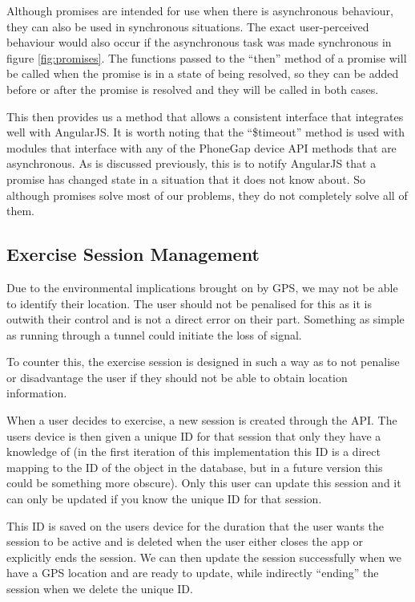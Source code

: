 Although promises are intended for use when there is asynchronous
behaviour, they can also be used in synchronous situations. The exact
user-perceived behaviour would also occur if the asynchronous task was
made synchronous in figure \ref{fig:promises}. The functions passed to
the ``then'' method of a promise will be called when the promise is in
a state of being resolved, so they can be added before or after the
promise is resolved and they will be called in both cases.

This then provides us a method that allows a consistent interface that
integrates well with AngularJS. It is worth noting that the
``\$timeout'' method is used with modules that interface with any of
the PhoneGap device API methods that are asynchronous. As is discussed
previously, this is to notify AngularJS that a promise has changed
state in a situation that it does not know about. So although promises
solve most of our problems, they do not completely solve all of them.

\subsection{Exercise Session Management}
\label{sec:session_mgmt}
Due to the environmental implications brought on by GPS, we may not be
able to identify their location. The user should not
be penalised for this as it is outwith their control and is not a
direct error on their part. Something as simple as running through a
tunnel could initiate the loss of signal. 

To counter this, the exercise session is designed in such a way as to
not penalise or disadvantage the user if they should not be able to
obtain location information. 

When a user decides to exercise, a new session is created through the
API. The users device is then given a unique ID for that session that
only they have a knowledge of (in the first iteration of this
implementation this ID is a direct mapping to the ID of the object in
the database, but in a future version this could be something more
obscure). Only this user can update this session and it can only be
updated if you know the unique ID for that session. 

This ID is saved on the users device for the duration that the user
wants the session to be active and is deleted when the user either
closes the app or explicitly ends the session. We can then update the
session successfully when we have a GPS location and are ready to
update, while indirectly ``ending'' the session when we delete the
unique ID.

